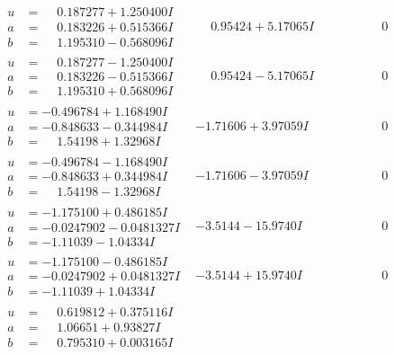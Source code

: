 \documentclass[1p]{elsarticle_modified}
\theoremstyle{definition}
\begin{document}
$$\begin{array}{c|c|c}
\begin{aligned}
u &= \phantom{-}0.187277 + 1.250400 I \\
a &= \phantom{-}0.183226 + 0.515366 I \\
b &= \phantom{-}1.195310 - 0.568096 I\end{aligned}
 & \phantom{-}0.95424 + 5.17065 I & \phantom{-0.000000 } 0 \\ \hline\begin{aligned}
u &= \phantom{-}0.187277 - 1.250400 I \\
a &= \phantom{-}0.183226 - 0.515366 I \\
b &= \phantom{-}1.195310 + 0.568096 I\end{aligned}
 & \phantom{-}0.95424 - 5.17065 I & \phantom{-0.000000 } 0 \\ \hline\begin{aligned}
u &= -0.496784 + 1.168490 I \\
a &= -0.848633 - 0.344984 I \\
b &= \phantom{-}1.54198 + 1.32968 I\end{aligned}
 & -1.71606 + 3.97059 I & \phantom{-0.000000 } 0 \\ \hline\begin{aligned}
u &= -0.496784 - 1.168490 I \\
a &= -0.848633 + 0.344984 I \\
b &= \phantom{-}1.54198 - 1.32968 I\end{aligned}
 & -1.71606 - 3.97059 I & \phantom{-0.000000 } 0 \\ \hline\begin{aligned}
u &= -1.175100 + 0.486185 I \\
a &= -0.0247902 - 0.0481327 I \\
b &= -1.11039 - 1.04334 I\end{aligned}
 & -3.5144 - 15.9740 I & \phantom{-0.000000 } 0 \\ \hline\begin{aligned}
u &= -1.175100 - 0.486185 I \\
a &= -0.0247902 + 0.0481327 I \\
b &= -1.11039 + 1.04334 I\end{aligned}
 & -3.5144 + 15.9740 I & \phantom{-0.000000 } 0 \\ \hline\begin{aligned}
u &= \phantom{-}0.619812 + 0.375116 I \\
a &= \phantom{-}1.06651 + 0.93827 I \\
b &= \phantom{-}0.795310 + 0.003165 I\end{aligned}

\end{array}$$
\end{document}
